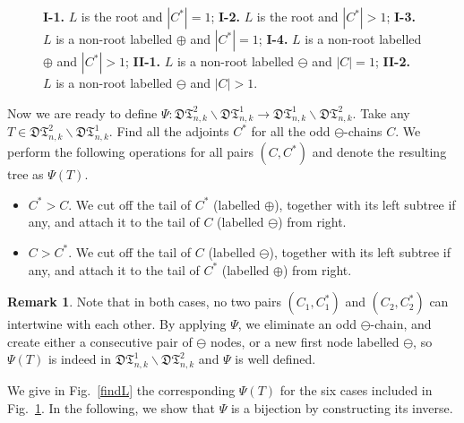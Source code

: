 \documentclass[12pt]{amsart}
\numberwithin{equation}{section}
\theoremstyle{plain}
\theoremstyle{definition}
\newtheorem{remark}[theorem]{Remark}
\def\D{\mathfrak{D}}
\def\T{\mathfrak{T}}
\begin{document}
\begin{figure}
\caption{{\bf I-1.} $L$ is the root and $|C^*|=1$; {\bf I-2.} $L$ is the root and $|C^*|>1$; {\bf I-3.} $L$ is a non-root labelled $\oplus$  and $|C^*|=1$; {\bf I-4.} $L$ is a non-root labelled $\oplus$  and $|C^*|>1$; {\bf II-1.} $L$ is a non-root labelled  $\ominus$  and $|C|=1$; {\bf II-2.} $L$ is a non-root labelled $\ominus$  and $|C|>1$.}
\label{findadj}
\end{figure}

Now we are ready to define $\Psi:\D\T^{2}_{n,k}\backslash \D\T^{1}_{n,k}\rightarrow\D\T^{1}_{n,k}\backslash \D\T^{2}_{n,k}$. Take any $T\in \D\T^{2}_{n,k}\backslash \D\T^{1}_{n,k}$. Find all the adjoints $C^*$ for all the odd $\ominus$-chains $C$. We perform the following operations for all pairs $(C,C^*)$ and denote the resulting tree as $\Psi(T)$.


 

 
\begin{itemize}
\item[Case I:] $C^*>C$. We cut off the tail of $C^*$ (labelled $\oplus$), together with its left subtree if any, and attach it to the tail of $C$ (labelled $\ominus$) from right.
\item[Case II:] $C>C^*$. We cut off the tail of $C$ (labelled $\ominus$), together with its left subtree if any, and attach it to the tail of $C^*$ (labelled $\oplus$) from right.
\end{itemize}

\begin{remark}
Note that in both cases, no two pairs $(C_1,C_1^{*})$ and $(C_2,C_2^{*})$ can intertwine with each other. By applying $\Psi$, we eliminate an odd $\ominus$-chain, and create either a consecutive pair of $\ominus$ nodes, or a new first node labelled $\ominus$, so $\Psi(T)$ is indeed in $\D\T^{1}_{n,k}\backslash \D\T^{2}_{n,k}$ and $\Psi$ is well defined. 
\end{remark}

We give in Fig.~\ref{findL} the corresponding $\Psi(T)$ for the six cases included in Fig.~\ref{findadj}. In the following, we show that $\Psi$ is a bijection by constructing its inverse. 
\end{document}
